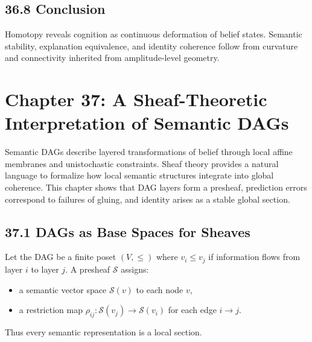 \documentclass[12pt,letterpaper]{article}
\theoremstyle{remark}
\begin{document}
\subsection{36.8 Conclusion}

Homotopy reveals cognition as continuous deformation of belief states. Semantic stability, explanation equivalence, and identity coherence follow from curvature and connectivity inherited from amplitude-level geometry.

\newpage

\section{Chapter 37: A Sheaf-Theoretic Interpretation of Semantic DAGs}

Semantic DAGs describe layered transformations of belief through local affine membranes and unistochastic constraints. Sheaf theory provides a natural language to formalize how local semantic structures integrate into global coherence. This chapter shows that DAG layers form a presheaf, prediction errors correspond to failures of gluing, and identity arises as a stable global section.

\subsection{37.1 DAGs as Base Spaces for Sheaves}

Let the DAG be a finite poset $(V,\le)$ where $v_i \le v_j$ if information flows from layer $i$ to layer $j$. A presheaf $\mathcal{S}$ assigns:

\begin{itemize}
    \item a semantic vector space $\mathcal{S}(v)$ to each node $v$,
    \item a restriction map $\rho_{ij} : \mathcal{S}(v_j)\to\mathcal{S}(v_i)$ for each edge $i\to j$.
\end{itemize}

Thus every semantic representation is a local section.

\end{document}

